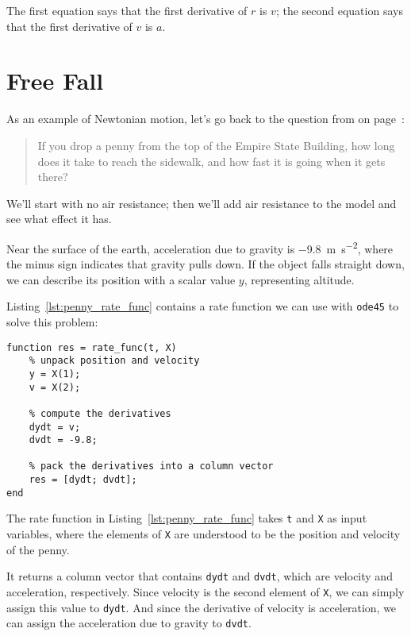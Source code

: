 The first equation says that the first derivative of $r$ is $v$;
the second equation says that the first derivative of $v$ is $a$.


\section{Free Fall}
\label{freefall}

As an example of Newtonian motion, let's go back to the question from  on page~\pageref{penny}:

\begin{quote}
If you drop a penny from the top of the Empire State Building, how long does it take to reach the sidewalk, and how fast it is going when it gets there?
\end{quote}

We'll start with no air resistance; then we'll add air resistance to the model and see what effect it has.


Near the surface of the earth,
acceleration due to gravity is \SI{-9.8}{\meter \per \second \squared}, where the minus sign
indicates that gravity pulls down.
If the object falls straight down, we can describe its position with a
scalar value $y$, representing altitude.

Listing~\ref{lst:penny_rate_func} contains a rate function we can use with \lstinline{ode45} to solve
this problem:

\begin{lstlisting}[caption={A rate function for the falling penny problem}, label={lst:penny_rate_func}]
function res = rate_func(t, X)
    % unpack position and velocity
    y = X(1);      
    v = X(2);      
    
    % compute the derivatives
    dydt = v;
    dvdt = -9.8;

    % pack the derivatives into a column vector
    res = [dydt; dvdt];
end
\end{lstlisting}

The rate function in Listing~\ref{lst:penny_rate_func} takes \lstinline{t} and \lstinline{X} as input variables, where the elements of \lstinline{X} are understood to be the position and velocity of the penny.

It returns a column vector that contains \lstinline{dydt} and \lstinline{dvdt}, which
are velocity and acceleration, respectively.
Since velocity is the second element of \lstinline{X}, we can simply assign this value to \lstinline{dydt}.
And since the derivative of velocity is acceleration, we can assign the acceleration due to gravity to \lstinline{dvdt}.


